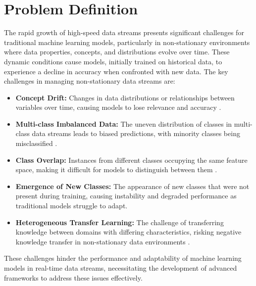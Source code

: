 \section{Problem Definition}
\label{sec:1_introduction_problem}
The rapid growth of high-speed data streams presents significant challenges for traditional machine learning models, particularly in non-stationary environments where data properties, concepts, and distributions evolve over time. These dynamic conditions cause models, initially trained on historical data, to experience a decline in accuracy when confronted with new data. The key challenges in managing non-stationary data streams are:
\begin{itemize}
    \setlength{\itemsep}{0pt}
    \setlength{\parskip}{0pt}
    \item \textbf{Concept Drift:} Changes in data distributions or relationships between variables over time, causing models to lose relevance and accuracy \cite{yang2021concept, dong2019multistream}.

    \item \textbf{Multi-class Imbalanced Data:} The uneven distribution of classes in multi-class data streams leads to biased predictions, with minority classes being misclassified \cite{wang2018systematic, sun2009classification}.

    \item \textbf{Class Overlap:} Instances from different classes occupying the same feature space, making it difficult for models to distinguish between them \cite{bhowan2012evolving, galar2011review}.

    \item \textbf{Emergence of New Classes:} The appearance of new classes that were not present during training, causing instability and degraded performance as traditional models struggle to adapt.

    \item \textbf{Heterogeneous Transfer Learning:} The challenge of transferring knowledge between domains with differing characteristics, risking negative knowledge transfer in non-stationary data environments \cite{pan2009survey, wang2018systematic}.
\end{itemize}
These challenges hinder the performance and adaptability of machine learning models in real-time data streams, necessitating the development of advanced frameworks to address these issues effectively.